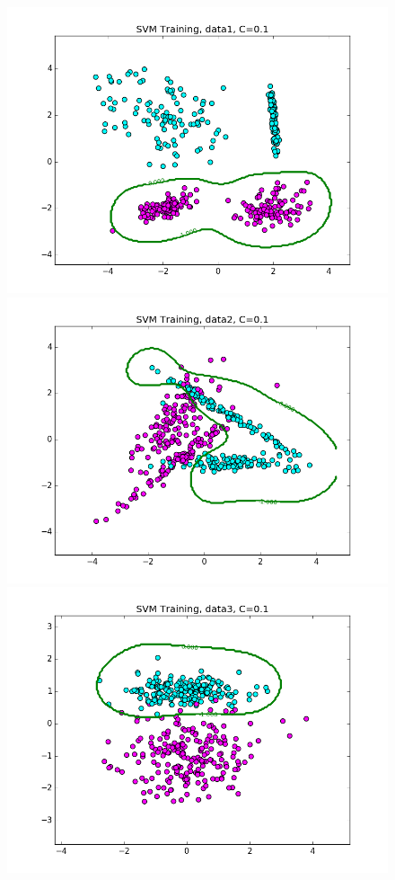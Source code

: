 \documentclass{article}
\begin{document}
\begin{figure}[width=\linewidth]
\centering
\begin{multicols}{2}
  \includegraphics[width=1.2\linewidth]{code/P2/rbf_training,C=01,data1.png}
  \includegraphics[width=1.2\linewidth]{code/P2/rbf_training,C=01,data2.png}
  \includegraphics[width=1.2\linewidth]{code/P2/rbf_training,C=01,data3.png}

\end{multicols}
\end{figure}
\end{document}
